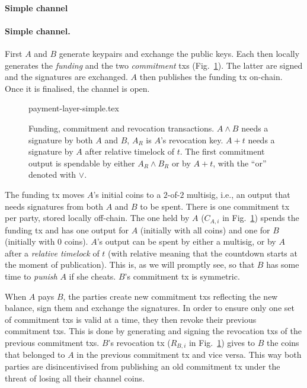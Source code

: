   \makeatletter%
    {\paragraph{Simple channel}}%
    {\paragraph{Simple channel.}}%
  \makeatother%
  First $A$ and $B$ generate keypairs and exchange the public keys. Each then
  locally generates the \emph{funding} and the two \emph{commitment} txs
  (Fig.~\ref{figure:payment-layer-simple}). The latter are signed and the
  signatures are exchanged. $A$ then publishes the funding tx on-chain. Once it
  is finalised, the channel is open.

  \begin{figure}
    \centering
    {payment-layer-simple.tex}
    \caption{Funding, commitment and revocation transactions. $A \wedge B$ needs
    a signature by both $A$ and $B$, $A_R$ is $A$'s revocation key. $A+t$
    needs a signature by $A$ after relative timelock of $t$. The first
    commitment output is spendable by either $A_R \wedge B_R$ or by $A + t$,
    with the ``or'' denoted with $\vee$.}
    \label{figure:payment-layer-simple}
  \end{figure}

  The funding tx moves $A$'s initial coins to a $2$-of-$2$ multisig, i.e., an
  output that needs signatures from both $A$ and $B$ to be spent. There is one
  commitment tx per party, stored locally off-chain. The one held by $A$
  ($C_{A,i}$ in Fig.~\ref{figure:payment-layer-simple}) spends the funding tx
  and has one output for $A$ (initially with all coins) and one for $B$
  (initially with $0$ coins). $A$'s output can be spent by either a multisig, or
  by $A$ after a \emph{relative timelock} of $t$ (with relative meaning that the countdown starts at the moment of
  publication). This is, as we will promptly see, so
  that $B$ has some time to \emph{punish} $A$ if she cheats. $B$'s commitment tx
  is symmetric.

  When $A$ pays $B$, the parties create new commitment txs reflecting the new
  balance, sign them and exchange the signatures. In order to ensure only one
  set of commitment txs is valid at a time, they then revoke their previous
  commitment txs. This is done by generating and signing the revocation txs of
  the previous commitment txs. $B$'s revocation tx ($R_{B,i}$ in
  Fig.~\ref{figure:payment-layer-simple}) gives to $B$ the coins that belonged
  to $A$ in the previous commitment tx and vice versa. This way both parties are
  disincentivised from publishing an old commitment tx under the threat of
  losing all their channel coins.

